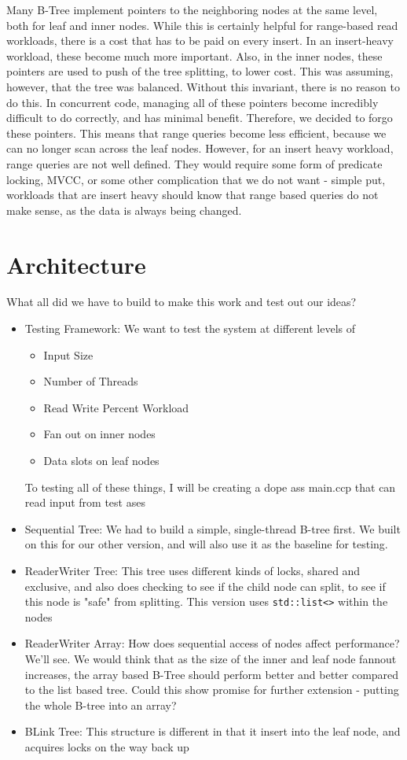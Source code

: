 \documentclass{sig-alternate}
\begin{document}
Many B-Tree implement pointers to the neighboring nodes at the same level, both for leaf and inner nodes.  While this is certainly helpful for range-based read workloads, there is a cost that has to be paid on every insert.  In an insert-heavy workload, these become much more important.  Also, in the inner nodes, these pointers are used to push of the tree splitting, to lower cost.  This was assuming, however, that the tree was balanced.  Without this invariant, there is no reason to do this.  In concurrent code, managing all of these pointers become incredibly difficult to do correctly, and has minimal benefit.  Therefore, we decided to forgo these pointers.  This means that range queries become less efficient, because we can no longer scan across the leaf nodes.  However, for an insert heavy workload, range queries are not well defined.  They would require some form of predicate locking, MVCC, or some other complication that we do not want - simple put, workloads that are insert heavy should know that range based queries do not make sense, as the data is always being changed.

\section{Architecture}
What all did we have to build to make this work and test out our ideas?
\begin{itemize}
  \item{Testing Framework:} We want to test the system at different levels of
    \begin{itemize}
      \item Input Size
      \item Number of Threads
      \item Read Write Percent Workload
      \item Fan out on inner nodes
      \item Data slots on leaf nodes
    \end{itemize}
    To testing all of these things, I will be creating a dope ass main.ccp that can read input from test ases
  \item{Sequential Tree:} We had to build a simple, single-thread B-tree first.  We built on this for our other version, and will also use it as the baseline for testing.
  \item{ReaderWriter Tree:} This tree uses different kinds of locks, shared and exclusive, and also does checking to see if the child node can split, to see if this node is "safe" from splitting.  This version uses \texttt{std::list<>} within the nodes
  \item{ReaderWriter Array:} How does sequential access of nodes affect performance?  We'll see.  We would think that as the size of the inner and leaf node fannout increases, the array based B-Tree should perform better and better compared to the list based tree.   Could this show promise for further extension - putting the whole B-tree into an array?
  \item{BLink Tree:} This structure is different in that it insert into the leaf node, and acquires locks on the way back up
\end{itemize}
\end{document}
